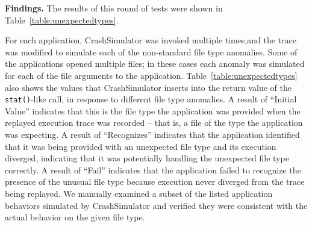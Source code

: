 {\bf Findings.}
The results of this round of tests were shown in
Table~\ref{table:unexpectedtypes}.

For each application, CrashSimulator was invoked multiple times,and
the trace was modified
to simulate each of the non-standard file type anomalies.  Some
of the applications opened multiple files; in these cases each anomaly was
simulated for each of the file arguments to the application.
Table~\ref{table:unexpectedtypes} also shows the values that CrashSimulator
inserts into the return value of the {\tt stat()}-like call,
in response to
different file type anomalies.  A result of ``Initial Value'' indicates
that this is the file type the application was provided when the replayed
execution trace was recorded -- that is, a file of the type the application
was expecting.  A result of ``Recognizes'' indicates that the application
identified that it was being provided with an unexpected file type and its
execution diverged, indicating that it was potentially handling the
unexpected file type correctly.  A result of ``Fail'' indicates that the
application failed to recognize the presence of the unusual file type
because execution never diverged from the trace being replayed.  We
manually examined a subset of the listed application behaviors simulated by
CrashSimulator and verified they were consistent with the actual behavior
on the given file type.

